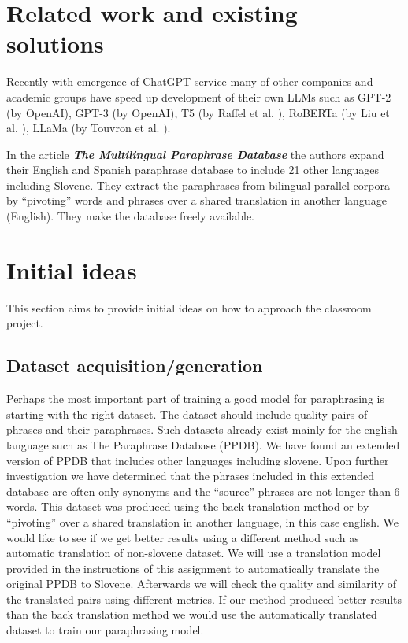 \documentclass[fleqn,moreauthors,10pt]{ds_report}
\begin{document}

\section*{Related work and existing solutions}
Recently with emergence of ChatGPT service many of other companies and academic groups have speed up development of their own LLMs such as GPT-2 (by OpenAI), GPT-3 (by OpenAI), T5 (by Raffel et al. \cite{https://doi.org/10.48550/arxiv.1910.10683}), RoBERTa (by Liu et al. \cite{https://doi.org/10.48550/arxiv.1907.11692}), LLaMa (by Touvron et al. \cite{https://doi.org/10.48550/arxiv.2302.13971}).

In the article \textit{\textbf{The Multilingual Paraphrase Database}}\cite{ganitkevitch2014multilingual} the authors expand their English and Spanish paraphrase database to include 21 other languages including Slovene. They extract the paraphrases from bilingual parallel corpora by “pivoting” words and phrases over a shared translation in another language (English). They make the database freely available. 




\section*{Initial ideas}
This section aims to provide initial ideas on how to approach the classroom project.

\subsection{Dataset acquisition/generation}
Perhaps the most important part of training a good model for paraphrasing is starting with the right dataset. The dataset should include quality pairs of phrases and their paraphrases. Such datasets already exist mainly for the english language such as The Paraphrase Database (PPDB)\cite{ganitkevitch2013ppdb}. We have found an extended version of PPDB that includes other languages including slovene\cite{ganitkevitch2014multilingual}. Upon further investigation we have determined that the phrases included in this extended database are often only synonyms and the “source” phrases are not longer than 6 words. This dataset was produced using the back translation method or by “pivoting” over a shared translation in another language, in this case english. We would like to see if we get better results using a different method such as automatic translation of non-slovene dataset. We will use a translation model provided in the instructions of this assignment \cite{slovene_nmt} to automatically translate the original PPDB to Slovene. Afterwards we will check the quality and similarity of the translated pairs using different metrics. If our method produced better results than the back translation method we would use the automatically translated dataset to train our paraphrasing model.
\end{document}
